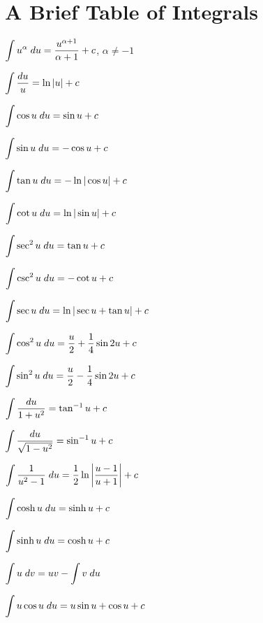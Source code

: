 \chapter{A Brief Table of Integrals}
\hypertarget{integrals}{}

\begin{description}
  \item $\displaystyle\int u^{\alpha}\;du=\frac{u^{\alpha+1}}{\alpha+1}+c$, \quad $\alpha\ne-1$

  \item $\displaystyle\int\frac{du}{u}=\ln|u|+c$

  \item $\displaystyle\int\cos u\;du=\sin u+c$

  \item $\displaystyle\int\sin u\;du=-\cos u+c$

  \item $\displaystyle\int\tan u\;du=-\ln|\cos u|+c$

  \item $\displaystyle\int\cot u\;du=\ln|\sin u|+c$

  \item $\displaystyle\int\sec^{2}u\;du=\tan u+c$

  \item $\displaystyle\int\csc^{2}u\;du=-\cot u+c$

  \item $\displaystyle\int\sec u\;du=\ln|\sec u+\tan u|+c$

  \item $\displaystyle\int\cos^{2}u\;du=\frac{u}{2}+\frac{1}{4}\sin2u+c$

  \item $\displaystyle\int\sin^{2}u\;du=\frac{u}{2}-\frac{1}{4}\sin2u+c$

  \item $\displaystyle\int\frac{du}{1+u^{2}}=\tan^{-1}u+c$

  \item $\displaystyle\int\frac{du}{\sqrt{1-u^{2}}}=\sin^{-1}u+c$

  \item $\displaystyle\int\frac{1}{u^{2}-1}\;du=\frac{1}{2}\ln\left|\frac{u-1}{u+1}\right|+c$

  \item $\displaystyle\int\cosh u\;du=\sinh u+c$

  \item $\displaystyle\int\sinh u\;du=\cosh u+c$

  \item $\displaystyle\int u\;dv=uv-\int v\;du$

  \item $\displaystyle\int u\cos u\;du=u\sin u+\cos u+c$


\end{description}
